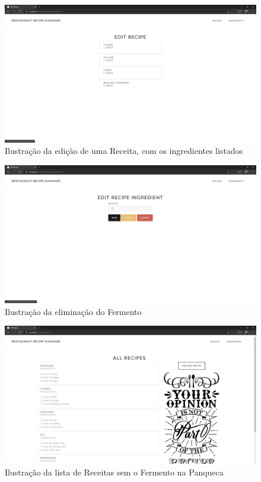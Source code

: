 \FloatBarrier
\begin{figure}[!hbt]
    \centering
    \includegraphics[width=14cm]{Resources/WebApp/Recipes/recipe (10).png}
    \caption{Ilustração da edição de uma Receita, com os ingredientes listados}
    
\end{figure}
\FloatBarrier
\begin{figure}[!hbt]
    \centering
    \includegraphics[width=14cm]{Resources/WebApp/Recipes/recipe (11).png}
    \caption{Ilustração da eliminação do Fermento}
    
\end{figure}
\FloatBarrier
\begin{figure}[!hbt]
    \centering
    \includegraphics[width=14cm]{Resources/WebApp/Recipes/recipe (12).png}
    \caption{Ilustração da lista de Receitas sem o Fermento na Panqueca}
    
\end{figure}
